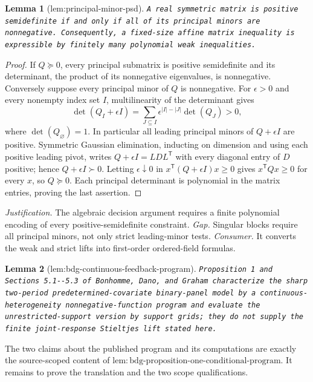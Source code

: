 \documentclass{article}
\newtheorem{lemma}{Lemma}
\begin{document}
\begin{lemma}[lem:principal-minor-psd]\label{lem:principal-minor-psd}
\texttt{A real symmetric matrix is positive semidefinite if and only if all of its
principal minors are nonnegative.  Consequently,\allowbreak{} a fixed-\allowbreak{}size affine matrix
inequality is expressible by finitely many polynomial weak inequalities.}
\end{lemma}
\begin{proof}
If \(Q\succeq0\), every principal submatrix is positive semidefinite and its
determinant, the product of its nonnegative eigenvalues, is nonnegative.
Conversely suppose every principal minor of \(Q\) is nonnegative.  For
\(\epsilon>0\) and every nonempty index set \(I\), multilinearity of the
determinant gives
\[
 \det(Q_I+\epsilon I)=
 \sum_{J\subseteq I}\epsilon^{|I|-|J|}\det(Q_J)>0,
\]
where \(\det(Q_\varnothing)=1\).  In particular all leading principal minors
of \(Q+\epsilon I\) are positive.  Symmetric Gaussian elimination, inducting
on dimension and using each positive leading pivot, writes
\(Q+\epsilon I=LDL^{\mathsf T}\) with every diagonal entry of \(D\) positive;
hence \(Q+\epsilon I\succ0\).  Letting \(\epsilon\downarrow0\) in
\(x^{\mathsf T}(Q+\epsilon I)x\ge0\) gives \(x^{\mathsf T}Qx\ge0\) for every
\(x\), so \(Q\succeq0\).  Each principal determinant is polynomial in the
matrix entries, proving the last assertion.
\end{proof}
\par\smallskip\noindent \textit{Justification.} The algebraic decision argument requires a finite polynomial encoding of every positive-semidefinite constraint. \textit{Gap.} Singular blocks require all principal minors, not only strict leading-minor tests. \textit{Consumer.} It converts the weak and strict lifts into first-order ordered-field formulas.

\begin{lemma}[lem:bdg-continuous-feedback-program]\label{lem:bdg-continuous-feedback-program}
\texttt{Proposition 1 and Sections 5.1-\allowbreak{}-\allowbreak{}5.3 of Bonhomme,\allowbreak{} Dano,\allowbreak{} and Graham characterize
the sharp two-\allowbreak{}period predetermined-\allowbreak{}covariate binary-\allowbreak{}panel model by a
continuous-\allowbreak{}heterogeneity nonnegative-\allowbreak{}function program and evaluate the
unrestricted-\allowbreak{}support version by support grids;\allowbreak{} they do not supply the finite
joint-\allowbreak{}response Stieltjes lift stated here.}
\end{lemma}
The two claims about the published program and its computations are exactly the source-scoped content of \(\mathrm{lem{:}bdg\text{-}proposition\text{-}one\text{-}conditional\text{-}program}\).  It remains to prove the translation and the two scope qualifications.
\end{document}
